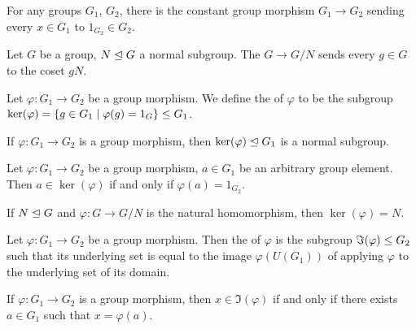 \begin{definition}
For any groups $G_{1}$, $G_{2}$, there is the constant group morphism
$G_{1}\to G_{2}$ sending every $x\in G_{1}$ to
$1_{G_{2}}\in G_{2}$.
\end{definition}

\begin{definition}
Let $G$ be a group, $N\trianglelefteq G$ a normal subgroup.
The  $G\to G/N$ sends every $g\in G$ to the
coset $gN$.
\end{definition}

\begin{definition}
Let $\varphi\colon G_{1}\to G_{2}$ be a group morphism. We define the
 of $\varphi$ to be the subgroup
$\ker(\varphi)=\{g\in G_{1}\mid\varphi(g)=1_{G}\}\leq G_{1}$.
\end{definition}

\begin{theorem}
  If $\varphi\colon G_{1}\to G_{2}$ is a group morphism,
  then $\ker(\varphi)\trianglelefteq G_{1}$ is a normal subgroup.
\end{theorem}

\begin{theorem}
Let $\varphi\colon G_{1}\to G_{2}$ be a group morphism, $a\in G_{1}$ be
an arbitrary group element.
Then $a\in\ker(\varphi)$ if and only if $\varphi(a)=1_{G_{2}}$.
\end{theorem}

\begin{theorem}
If $N\trianglelefteq G$ and $\varphi\colon G\to G/N$ is the natural
homomorphism, then $\ker(\varphi)=N$.
\end{theorem}

\begin{definition}
  Let $\varphi\colon G_{1}\to G_{2}$ be a group morphism.
  Then the  of $\varphi$ is the subgroup
  $\Im(\varphi)\leq G_{2}$ such that its underlying set is equal to
  the image $\varphi(U(G_{1}))$ of applying $\varphi$ to the underlying
  set of its domain.
\end{definition}

\begin{theorem}
If $\varphi\colon G_{1}\to G_{2}$ is a group morphism, then
$x\in\Im(\varphi)$ if and only if there exists $a\in G_{1}$ such that $x=\varphi(a)$.
\end{theorem}

